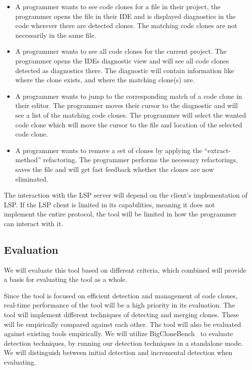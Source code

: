 \begin{itemize}
	\item A programmer wants to see code clones for a file in their project, the
	      programmer opens the file in their IDE and is displayed diagnostics in the code
	      wherever there are detected clones. The matching code clones are not necessarily
	      in the same file.

	\item A programmer wants to see all code clones for the current project. The
	      programmer opens the IDEs diagnostic view and will see all code clones detected
	      as diagnostics there. The diagnostic will contain information like where the clone
	      exists, and where the matching clone(s) are.

	\item A programmer wants to jump to the corresponding match of a code clone in their
	      editor. The programmer moves their cursor to the diagnostic and will see a list of
	      the matching code clones. The programmer will select the wanted code clone which
	      will move the cursor to the file and location of the selected code clone.

      \item A programmer wants to remove a set of clones by applying the
          ``extract-method'' refactoring. The programmer performs the necessary
          refactorings, saves the file and will get fast feedback whether the
          clones are now eliminated.
\end{itemize}

The interaction with the LSP server will depend on the client's implementation of LSP. If
the LSP client is limited in its capabilities, meaning it does not implement the entire
protocol, the tool will be limited in how the programmer can interact with it.



\subsection{Evaluation}

We will evaluate this tool based on different criteria, which combined will provide a
basis for evaluating the tool as a whole.

Since the tool is focused on efficient detection and management of code clones, real-time
performance of the tool will be a high priority in its evaluation. The tool will implement
different techniques of detecting and merging clones. These will be empirically compared
against each other. The tool will also be evaluated against existing tools empirically. We
will utilize BigCloneBench~\cite{BigCloneBench} to evaluate detection techniques, by
running our detection techniques in a standalone mode. We will distinguish between initial
detection and incremental detection when evaluating.

